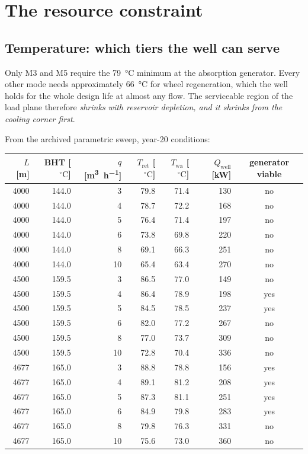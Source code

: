 \documentclass[11pt]{article}
\newcommand{\degC}{\ensuremath{^{\circ}\mathrm{C}}}
\begin{document}
\section{The resource constraint}\label{sec:resource}

\subsection{Temperature: which tiers the well can serve}

Only M3 and M5 require the \SI{79}{\degreeCelsius} minimum at the absorption
generator. Every other mode needs approximately \SI{66}{\degreeCelsius} for
wheel regeneration, which the well holds for the whole design life at almost
any flow. The serviceable region of the load plane therefore \emph{shrinks
with reservoir depletion, and it shrinks from the cooling corner first}.

From the archived parametric sweep, year-20 conditions:

\begin{longtable}{@{}rrrrrrc@{}}
\toprule
$L$ [\si{\metre}] & BHT [\degC] & $q$ [\si{\cubic\metre\per\hour}] &
$T_{\mathrm{ret}}$ [\degC] & $T_{\mathrm{wa}}$ [\degC] &
$Q_{\mathrm{well}}$ [\si{\kilo\watt}] & generator viable \\
\midrule
\endhead
4000 & 144.0 & 3 & 79.8 & 71.4 & 130 & no \\
4000 & 144.0 & 4 & 78.7 & 72.2 & 168 & no \\
4000 & 144.0 & 5 & 76.4 & 71.4 & 197 & no \\
4000 & 144.0 & 6 & 73.8 & 69.8 & 220 & no \\
4000 & 144.0 & 8 & 69.1 & 66.3 & 251 & no \\
4000 & 144.0 & 10 & 65.4 & 63.4 & 270 & no \\
4500 & 159.5 & 3 & 86.5 & 77.0 & 149 & no \\
4500 & 159.5 & 4 & 86.4 & 78.9 & 198 & yes \\
4500 & 159.5 & 5 & 84.5 & 78.5 & 237 & yes \\
4500 & 159.5 & 6 & 82.0 & 77.2 & 267 & no \\
4500 & 159.5 & 8 & 77.0 & 73.7 & 309 & no \\
4500 & 159.5 & 10 & 72.8 & 70.4 & 336 & no \\
4677 & 165.0 & 3 & 88.8 & 78.8 & 156 & yes \\
4677 & 165.0 & 4 & 89.1 & 81.2 & 208 & yes \\
4677 & 165.0 & 5 & 87.3 & 81.1 & 251 & yes \\
4677 & 165.0 & 6 & 84.9 & 79.8 & 283 & yes \\
4677 & 165.0 & 8 & 79.8 & 76.3 & 331 & no \\
4677 & 165.0 & 10 & 75.6 & 73.0 & 360 & no \\

\bottomrule
\end{longtable}
\end{document}
